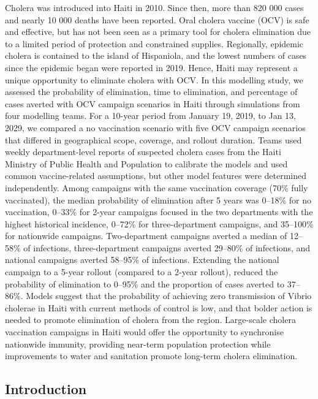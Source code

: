  Cholera was introduced into Haiti in 2010. Since then, more than 820 000 cases and nearly 10 000 deaths have been reported. Oral cholera vaccine (OCV) is safe and effective, but has not been seen as a primary tool for cholera elimination due to a limited period of protection and constrained supplies. Regionally, epidemic cholera is contained to the island of Hispaniola, and the lowest numbers of cases since the epidemic began were reported in 2019. Hence, Haiti may represent a unique opportunity to eliminate cholera with OCV. 
 In this modelling study, we assessed the probability of elimination, time to elimination, and percentage of cases averted with OCV campaign scenarios in Haiti through simulations from four modelling teams. For a 10-year period from January 19, 2019, to Jan 13, 2029, we compared a no vaccination scenario with five OCV campaign scenarios that differed in geographical scope, coverage, and rollout duration. Teams used weekly department-level reports of suspected cholera cases from the Haiti Ministry of Public Health and Population to calibrate the models and used common vaccine-related assumptions, but other model features were determined independently. 
 Among campaigns with the same vaccination coverage (70\% fully vaccinated), the median probability of elimination after 5 years was 0–18\% for no vaccination, 0–33\% for 2-year campaigns focused in the two departments with the highest historical incidence, 0–72\% for three-department campaigns, and 35–100\% for nationwide campaigns. Two-department campaigns averted a median of 12–58\% of infections, three-department campaigns averted 29–80\% of infections, and national campaigns averted 58–95\% of infections. Extending the national campaign to a 5-year rollout (compared to a 2-year rollout), reduced the probability of elimination to 0–95\% and the proportion of cases averted to 37–86\%. 
 Models suggest that the probability of achieving zero transmission of Vibrio cholerae in Haiti with current methods of control is low, and that bolder action is needed to promote elimination of cholera from the region. Large-scale cholera vaccination campaigns in Haiti would offer the opportunity to synchronise nationwide immunity, providing near-term population protection while improvements to water and sanitation promote long-term cholera elimination. 


\subsection{Introduction}


